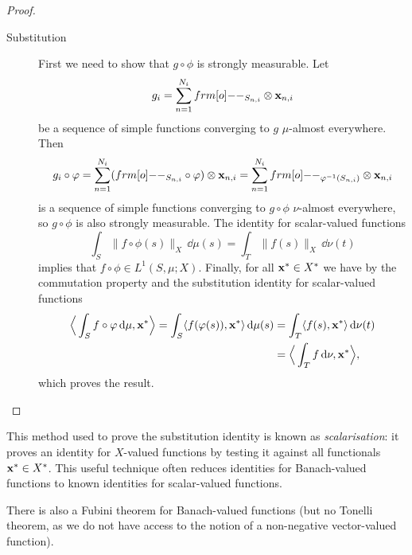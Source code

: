 \begin{proof}
\begin{description}
  \item[Substitution]
    First we need to show that $g \circ \phi$ is strongly measurable.
    Let
    \begin{equation*}
      g_i = \sum_{n=1}^{N_i} \1_{S_{n,i}} \otimes \mb{x}_{n,i}
    \end{equation*}
    be a sequence of simple functions converging to $g$ $\mu$-almost everywhere.
    Then
    \begin{equation*}
      g_i \circ \phi = \sum_{n=1}^{N_i} (\1_{S_{n,i}} \circ \phi) \otimes \mb{x}_{n,i} = \sum_{n=1}^{N_i} \1_{\phi^{-1}(S_{n,i})} \otimes \mb{x}_{n,i}
    \end{equation*}
    is a sequence of simple functions converging to $g \circ \phi$ $\nu$-almost everywhere, so $g \circ \phi$ is also strongly measurable.
    The identity for scalar-valued functions
    \begin{equation*}
      \int_S \|f \circ \phi(s)\|_X \, \dd\mu(s) = \int_T \|f(s)\|_X \, \dd\nu(t)
    \end{equation*}
    implies that $f \circ \phi \in L^1(S,\mu;X)$.
    Finally, for all $\mathbf{x}^* \in X^*$ we have by the commutation property and the substitution identity for scalar-valued functions
    \begin{equation*}
      \begin{aligned}
        \Big\langle \int_S f \circ \varphi \, \mathrm{d}\mu , \mathbf{x}^* \Big\rangle
        = \int_S \langle f(\varphi(s)), \mathbf{x}^* \rangle \, \mathrm{d}\mu(s)
        &= \int_T \langle f(s), \mathbf{x}^* \rangle \, \mathrm{d}\nu(t) \\
        &= \Big\langle \int_T f \, \mathrm{d}\nu, \mathbf{x}^* \Big\rangle,
      \end{aligned}
    \end{equation*}
    which proves the result.
  \end{description}
\end{proof}

\begin{rmk}
  This method used to prove the substitution identity is known as \emph{scalarisation}: it proves an identity for $X$-valued functions by testing it against all functionals $\mathbf{x}^* \in X^*$.
  This useful technique often reduces identities for Banach-valued functions to known identities for scalar-valued functions.
\end{rmk}

There is also a Fubini theorem for Banach-valued functions (but no Tonelli theorem, as we do not have access to the notion of a non-negative vector-valued function).

